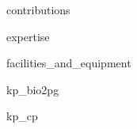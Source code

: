 {contributions}

\newpage

{expertise}

\newpage

{facilities_and_equipment}

\newpage

{kp_bio2pg}

\newpage

{kp_cp}


